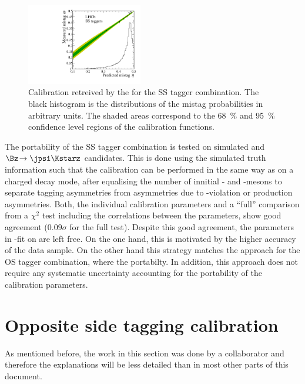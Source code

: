 \begin{figure}[tbp]
	\begin{center}
		\includegraphics[width=0.45\textwidth]{08FlavourTagging/figs/CalibrationSS.pdf}
	\end{center}
	\caption{Calibration retreived by the for the SS tagger combination.
	The black histogram is the distributions of the mistag probabilities in arbitrary units.
	The shaded areas correspond to the \SI{68}{\percent} and \SI{95}{\percent} confidence level regions of the calibration functions.}
	\label{fig:CalibSS}
\end{figure}

The portability of the SS tagger combination is tested on simulated \BdToDpi and $\Bz\!\to\jpsi\Kstarz$ candidates.
This is done using the simulated truth information such that the calibration can be performed in the same way as on a charged decay mode, after equalising the number of innitial \Bz- and \Bzb-mesons to separate tagging asymmetries from asymmetries due to \CP-violation or production asymmetries.
Both, the individual calibration parameters and a \enquote{full} comparison from a $\chi^2$ test including the correlations between the parameters, show good agreement (\eg $0.09\sigma$ for the full test).
Despite this good agreement, the parameters in \CP-fit on \BdToDpi are left free.
On the one hand, this is  motivated by the higher accuracy of the \BdToDpi data sample.
On the other hand this strategy matches the approach for the OS tagger combination, where the portabilty.
In addition, this approach does not require any systematic uncertainty accounting for the portability of the calibration parameters.

\section{Opposite side tagging calibration}
\label{sec:OScalibration}

As mentioned before, the work in this section was done by a collaborator and therefore the explanations will be less detailed than in most other parts of this document.

